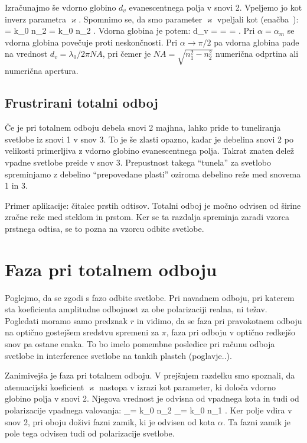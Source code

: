 Izračunajmo še vdorno globino $d_v$ evanescentnega polja v snovi 2. Vpeljemo jo kot inverz 
parametra $\varkappa$. Spomnimo se, da smo parameter $\varkappa$ vpeljali kot (enačba~):
\beq
\varkappa = k_0 n_2 \kappa = k_0 n_2 .
\eeq
Vdorna globina je potem:
\beq
d_v =  = =
.
\eeq
Pri $\alpha = \alpha_m$ se vdorna globina povečuje proti neskončnosti. Pri $\alpha \to \pi/2$ pa vdorna
globina pade na vrednost $d_v = \lambda_0/2\pi NA$, pri čemer je $NA = \sqrt{n_1^2-n_2^2}$ numerična odprtina
ali numerična apertura. 

\subsection*{Frustrirani totalni odboj}
Če je pri totalnem odboju debela snovi 2 majhna, lahko pride to tuneliranja svetlobe iz snovi 1 v snov 3. To je 
še zlasti opazno, kadar je debelina snovi 2 po velikosti primerljiva z vdorno globino evanescentnega polja. Takrat
znaten delež vpadne svetlobe preide v snov 3. Prepustnost takega ``tunela'' za svetlobo spreminjamo
z debelino ``prepovedane plasti'' oziroma debelino reže med snovema 1 in 3. 

Primer aplikacije: čitalec prstih odtisov. Totalni odboj je močno odvisen od širine zračne reže med steklom
in prstom. Ker se ta razdalja spreminja zaradi vzorca prstnega odtisa, se to pozna na vzorcu odbite svetlobe. 

\section{Faza pri totalnem odboju}
Poglejmo, da se zgodi s fazo odbite svetlobe. Pri navadnem odboju, pri katerem sta koeficienta
amplitudne odbojnost za obe polarizaciji realna, ni težav. Pogledati moramo samo predznak $r$ in vidimo,
da se faza pri pravokotnem odboju na optično gostejšem sredstvu spremeni za $\pi$, faza pri odboju v optično
redkejšo snov pa ostane enaka. To bo imelo pomembne posledice pri računu odboja svetlobe in 
interference svetlobe na tankih plasteh (poglavje..). 

Zanimivejša je faza pri totalnem odboju. V prejšnjem razdelku smo spoznali, da atenuacijski koeficient
$\varkappa$ nastopa v izrazi kot parameter, ki določa vdorno globino polja v snovi 2. Njegova vrednost
je odvisna od vpadnega kota in tudi od polarizacije vpadnega valovanja:
\beq
\varkappa_{}= k_0 n_2  
\qquad {}\qquad
\varkappa_{}= k_0 n_1 .
\eeq
Ker polje vdira v snov 2, pri oboju doživi fazni zamik, ki je odvisen od kota $\alpha$. Ta fazni
zamik je pole tega odvisen tudi od polarizacije svetlobe. 

